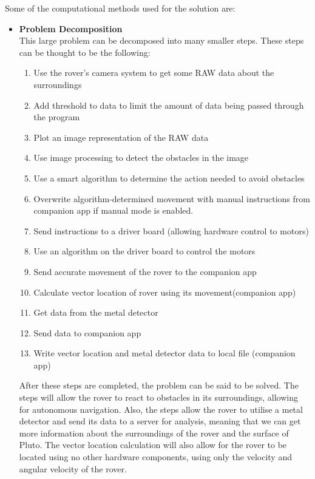 \documentclass[11pt]{report}
\begin{document}
Some of the computational methods used for the solution are:

\begin{itemize}
	
	
	\item{\textbf{Problem Decomposition}}
	\\This large problem can be decomposed into many smaller steps. These steps can be thought to be the 			following:
	\begin{enumerate}
		\item{Use the rover's camera system to get some RAW data about the surroundings}
		\item{Add threshold to data to limit the amount of data being passed through the program}
		\item{Plot an image representation of the RAW data}
		\item{Use image processing to detect the obstacles in the image}
		\item{Use a smart algorithm to determine the action needed to avoid obstacles}
		\item{Overwrite algorithm-determined movement with manual instructions from companion app if manual mode is enabled.}
		\item{Send instructions to a driver board (allowing hardware control to motors)}
		\item{Use an algorithm on the driver board to control the motors}
		\item{Send accurate movement of the rover to the companion app}
		\item{Calculate vector location of rover using its movement(companion app)}
		\item{Get data from the metal detector}
		\item{Send data to companion app}
		\item{Write vector location and metal detector data to local file (companion app)}
	\end{enumerate}
	After these steps are completed, the problem can be said to be solved. The steps will allow the rover to 			react to obstacles in its surroundings, allowing for autonomous navigation. Also, the steps allow the 			rover to utilise a metal detector and send its data to a server for analysis, meaning that we can get 			more information about the surroundings of the rover and the surface of Pluto. The vector location 			calculation will also allow for the rover to be located using no other hardware components, using only 			the velocity and angular velocity of the rover.
	

\end{itemize}
\end{document}
